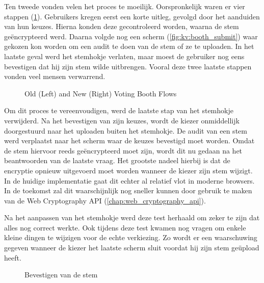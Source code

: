 \npar Ten tweede vonden velen het proces te moeilijk. Oorspronkelijk waren er vier stappen (\ref{fig:kv:voting_booth_flows}). Gebruikers kregen eerst een korte uitleg, gevolgd door het aanduiden van hun keuzes. Hierna konden deze gecontroleerd worden, waarna de stem ge\"encrypteerd werd. Daarna volgde nog een scherm (\ref{fig:kv:booth_submit}) waar gekozen kon worden om een audit te doen van de stem of ze te uploaden. In het laatste geval werd het stemhokje verlaten, maar moest de gebruiker nog eens bevestigen dat hij zijn stem wilde uitbrengen. Vooral deze twee laatste stappen vonden veel mensen verwarrend.

\begin{figure}
  \centering
  \begin{minipage}{.45\linewidth}
    \centering
    \scalebox{.7}{}
  \end{minipage}
  \quad
  \begin{minipage}{.45\linewidth}
    \centering
    \scalebox{.7}{}
  \end{minipage}
  \caption{Old (Left) and New (Right) Voting Booth Flows}
  \label{fig:kv:voting_booth_flows}
\end{figure}

\npar Om dit proces te vereenvoudigen, werd de laatste stap van het stemhokje verwijderd. Na het bevestigen van zijn keuzes, wordt de kiezer onmiddellijk doorgestuurd naar het uploaden buiten het stemhokje. De audit van een stem werd verplaatst naar het scherm waar de keuzes bevestigd moet worden. Omdat de stem hiervoor reeds ge\"encrypteerd moet zijn, wordt dit nu gedaan na het beantwoorden van de laatste vraag. Het grootste nadeel hierbij is dat de encryptie opnieuw uitgevoerd moet worden wanneer de kiezer zijn stem wijzigt. In de huidige implementatie gaat dit echter al relatief vlot in moderne browsers. In de toekomst zal dit waarschijnlijk nog sneller kunnen door gebruik te maken van de Web Cryptography API (\ref{chap:web_cryptography_api}).

\npar Na het aanpassen van het stemhokje werd deze test herhaald om zeker te zijn dat alles nog correct werkte. Ook tijdens deze test kwamen nog vragen om enkele kleine dingen te wijzigen voor de echte verkiezing. Zo wordt er een waarschuwing gegeven wanneer de kiezer het laatste scherm sluit voordat hij zijn stem ge\"upload heeft.

\begin{figure}
  \caption{Bevestigen van de stem}
  \label{fig:kv:cast_confirm}
\end{figure}

